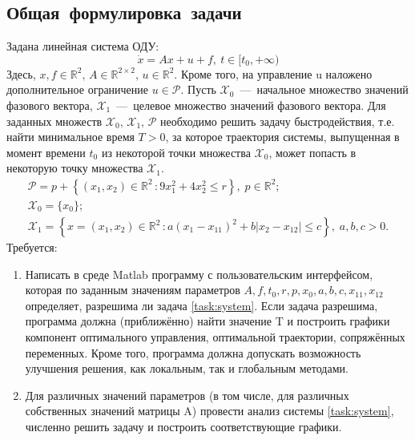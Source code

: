 \documentclass[11pt, oneside, final]{article}
\theoremstyle{break}
\numberwithin{equation}{section}
\theoremstyle{plain}
\theoremstyle{definition}
\newcommand \real{\mathbb{R}}
\begin{document}
    \subsection{Общая~формулировка~задачи} 
    \label{sub:general}
    Задана линейная система ОДУ: 
    \begin{equation} 
        \label{task:system} 
        \dot x = Ax + u + f,\:t \in [t_0, +\infty)
    \end{equation}
    Здесь, \(x, f \in \real^2, \, A \in \real^{2\times2}, \, u \in \real^2 \).
     Кроме того, на управление u наложено дополнительное ограничение \(u \in \mathcal{P} \). Пусть \( \mathcal{X}_0 \)~---~начальное множество значений фазового вектора, \( \mathcal{X}_1 \)~---~целевое множество значений фазового вектора. Для заданных множеств \( \mathcal{X}_0 ,\, \mathcal{X}_1, \, \mathcal{P} \) необходимо решить задачу быстродействия, т.е. найти минимальное время \(T > 0 \), за которое траектория системы, выпущенная в момент времени \( t_0 \) из некоторой точки множества \( \mathcal{X}_0 \), может попасть в некоторую точку множества \( \mathcal{X}_1 \). 
    \begin{gather}
        \label{task:P} 
        \mathcal{P} = p + \left\{ (x_1, x_2) \in \real^2 \, \colon 9x_1^2 + 4x_2^2 \leqslant r \right\}, \; p \in \real ^2; \\
        \label{task:X0}
        \mathcal{X}_0 = \{x_0\}; \\
        \label{task:X1}
        \mathcal{X}_1 = \left\{ x = (x_1, x_2) \in \real^2 \, \colon a(x_1 - x_{11})^2 + b |x_2 - x_{12}| \leqslant c \right\}, \; a, b, c > 0.
    \end{gather} 
    Требуется: 
    \begin{enumerate} 
        \item Написать в среде Matlab программу с пользовательским интерфейсом, которая по заданным значениям параметров \(A, f, t_0, r, p, x_0, a, b, c, x_{11}, x_{12}\) определяет, разрешима ли задача \eqref{task:system}. Если задача разрешима, программа должна (приближённо) найти значение T и построить графики компонент оптимального управления, оптимальной траектории, сопряжённых переменных. Кроме того, программа должна допускать возможность улучшения решения, как локальным, так и глобальным методами.
        \item Для различных значений параметров (в том числе, для различных собственных значений матрицы A) провести анализ системы \eqref{task:system}, численно решить задачу и построить соответствующие графики.
    \end{enumerate}
    \pagebreak
\end{document}
